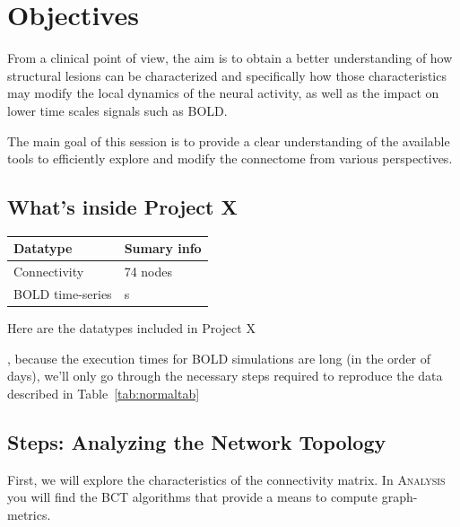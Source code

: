 \documentclass{tufte-handout}
\begin{document}
\section{Objectives}\label{sec:objectives}

From a clinical point of view, the aim is to obtain a better understanding of
how structural lesions can be characterized and specifically how those
characteristics may modify the local dynamics of the neural activity, as well
as the impact on lower time scales signals such as BOLD.

\noindent The main goal of this session is to provide a clear understanding of the
available tools to efficiently explore and modify the connectome from various
perspectives.


\subsection{What's inside Project X }\label{sec:project_data}

\begin{margintable}
  \centering
  \selectfont
  \begin{tabular}{ll}
    \toprule
    Datatype & Sumary info                       \\
    \midrule
    Connectivity & 74 {nodes}                    \\
    BOLD time-series & \unit[200]{s}             \\
    \bottomrule
  \end{tabular}
  \caption{Here are the datatypes included in Project X}
  \label{tab:normaltab}
\end{margintable}



, because the execution times for BOLD simulations
are long (in the order of days), we'll only go through the necessary steps
required to reproduce the data described in Table~\ref{tab:normaltab}


\subsection{Steps: Analyzing the Network Topology}\label{sec:steps}

First, we will explore the characteristics of the connectivity matrix. In
\textsc{Analysis} you will find the BCT 
algorithms that provide a means to compute graph-metrics.
\end{document}
